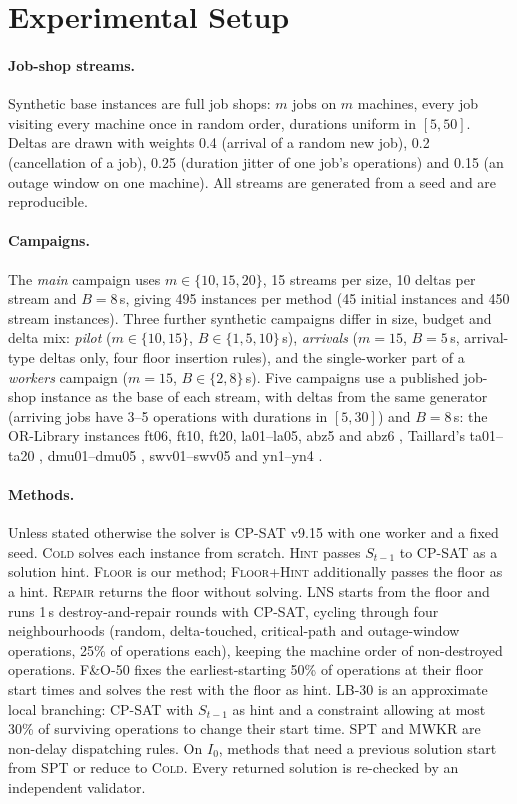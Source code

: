 \documentclass[letterpaper]{article} %
\newcommand{\mcold}{\textsc{Cold}}
\newcommand{\mhint}{\textsc{Hint}}
\newcommand{\mfloor}{\textsc{Floor}}
\newcommand{\mfh}{\textsc{Floor+Hint}}
\newcommand{\mrep}{\textsc{Repair}}
\newcommand{\mlns}{\textsc{LNS}}
\newcommand{\mfo}{\textsc{F\&O-50}}
\newcommand{\mlb}{\textsc{LB-30}}
\newcommand{\mspt}{\textsc{SPT}}
\newcommand{\mmwkr}{\textsc{MWKR}}
\begin{document}
\section{Experimental Setup}

\paragraph{Job-shop streams.} Synthetic base instances are full job shops: $m$ jobs on $m$ machines, every job visiting every machine once in random order, durations uniform in $[5, 50]$. Deltas are drawn with weights 0.4 (arrival of a random new job), 0.2 (cancellation of a job), 0.25 (duration jitter of one job's operations) and 0.15 (an outage window on one machine). All streams are generated from a seed and are reproducible.

\paragraph{Campaigns.} The \emph{main} campaign uses $m \in \{10, 15, 20\}$, 15 streams per size, 10 deltas per stream and $B = 8$\,s, giving 495 instances per method (45 initial instances and 450 stream instances). Three further synthetic campaigns differ in size, budget and delta mix: \emph{pilot} ($m \in \{10,15\}$, $B \in \{1, 5, 10\}$\,s), \emph{arrivals} ($m=15$, $B = 5$\,s, arrival-type deltas only, four floor insertion rules), and the single-worker part of a \emph{workers} campaign ($m=15$, $B \in \{2, 8\}$\,s). Five campaigns use a published job-shop instance as the base of each stream, with deltas from the same generator (arriving jobs have 3--5 operations with durations in $[5,30]$) and $B=8$\,s: the OR-Library instances ft06, ft10, ft20, la01--la05, abz5 and abz6 \citep{beasley1990}, Taillard's ta01--ta20 \citep{taillard1993}, dmu01--dmu05 \citep{demirkol1998}, swv01--swv05 \citep{storer1992} and yn1--yn4 \citep{yamada1992}.

\paragraph{Methods.} Unless stated otherwise the solver is CP-SAT v9.15 with one worker and a fixed seed. \mcold{} solves each instance from scratch. \mhint{} passes $S_{t-1}$ to CP-SAT as a solution hint. \mfloor{} is our method; \mfh{} additionally passes the floor as a hint. \mrep{} returns the floor without solving. \mlns{} starts from the floor and runs 1\,s destroy-and-repair rounds with CP-SAT, cycling through four neighbourhoods (random, delta-touched, critical-path and outage-window operations, 25\% of operations each), keeping the machine order of non-destroyed operations. \mfo{} fixes the earliest-starting 50\% of operations at their floor start times and solves the rest with the floor as hint. \mlb{} is an approximate local branching: CP-SAT with $S_{t-1}$ as hint and a constraint allowing at most 30\% of surviving operations to change their start time. \mspt{} and \mmwkr{} are non-delay dispatching rules. On $I_0$, methods that need a previous solution start from \mspt{} or reduce to \mcold. Every returned solution is re-checked by an independent validator.
\end{document}
